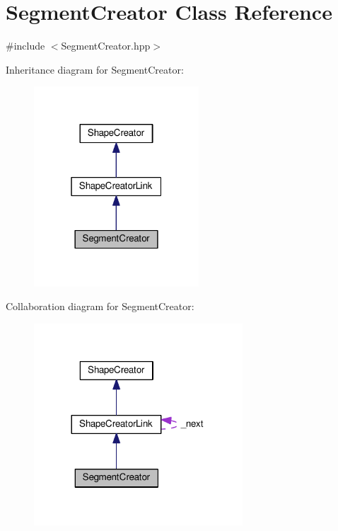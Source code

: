 \hypertarget{class_segment_creator}{}\section{Segment\+Creator Class Reference}
\label{class_segment_creator}


{\ttfamily \#include $<$Segment\+Creator.\+hpp$>$}



Inheritance diagram for Segment\+Creator\+:\nopagebreak
\begin{figure}[H]
\begin{center}
\leavevmode
\includegraphics[width=175pt]{class_segment_creator__inherit__graph}
\end{center}
\end{figure}


Collaboration diagram for Segment\+Creator\+:\nopagebreak
\begin{figure}[H]
\begin{center}
\leavevmode
\includegraphics[width=221pt]{class_segment_creator__coll__graph}
\end{center}
\end{figure}
